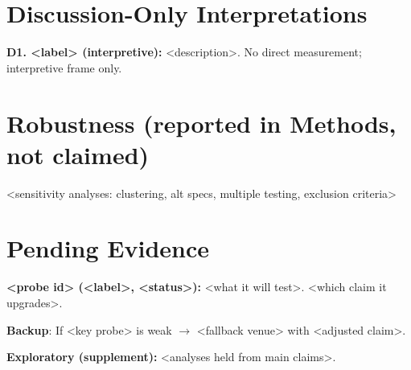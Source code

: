 \documentclass[11pt]{article}
\begin{document}

\section*{Discussion-Only Interpretations}

\textbf{D1. <label> (interpretive):} <description>. No direct measurement; interpretive frame only.

\section*{Robustness (reported in Methods, not claimed)}

<sensitivity analyses: clustering, alt specs, multiple testing, exclusion criteria>

\section*{Pending Evidence}

\textbf{<probe id> (<label>, <status>):} <what it will test>. <which claim it upgrades>.

\textbf{Backup}: If <key probe> is weak $\to$ <fallback venue> with <adjusted claim>.

\textbf{Exploratory (supplement):} <analyses held from main claims>.

\end{document}

